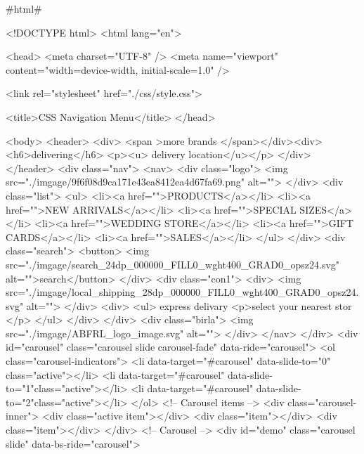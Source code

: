                                    #html#

<!DOCTYPE html>
<html lang="en">

    <head>
        <meta charset="UTF-8" />
        <meta name="viewport" content="width=device-width, initial-scale=1.0" />
 
        <link rel="stylesheet" href="./css/style.css">

    
        <title>CSS Navigation Menu</title>
    </head>

    <body>
        <header>
          <div>
<span >more brands </span></div><div>
<h6>delivering</h6> <p><u> delivery location</u></p>
</div>
        </header>
      <div class="nav">
            <nav>
                <div class="logo">
                <img src="./imgage/9f6f08d9ca171e43ea8412ea4d67fa69.png" alt="">
            </div>
                <div class="list">
                    <ul>
                    <li><a href="">PRODUCTS</a></li>
                    <li><a href="">NEW ARRIVALS</a></li>
                    <li><a href="">SPECIAL SIZES</a></li>
                    <li><a href="">WEDDING STORE</a></li>
                    <li><a href="">GIFT CARDS</a></li>
                    <li><a href="">SALES</a></li>
                </ul>
                </div>
                <div class="search">
                <button> <img src="./imgage/search_24dp_000000_FILL0_wght400_GRAD0_opsz24.svg" alt="">search</button>
                </div>
                <div class="con1">
                    <div>
                    <img src="./imgage/local_shipping_28dp_000000_FILL0_wght400_GRAD0_opsz24.svg" alt="">
                    </div>
                    <div>
                        <ul>
                              express delivary
                            <p>select your nearest stor </p>
                        </ul>
                    </div>
                </div>
                <div class="birla">
                <img src="./imgage/ABFRL_logo_image.svg" alt="">
                </div>
            </nav>
      </div>
      <div id="carousel" class="carousel slide carousel-fade" data-ride="carousel">
        <ol class="carousel-indicators">
            <li data-target="#carousel" data-slide-to="0" class="active"></li>
            <li data-target="#carousel" data-slide-to="1"class="active"></li>
            <li data-target="#carousel" data-slide-to="2"class="active"></li>
        </ol>
        <!-- Carousel items -->
        <div class="carousel-inner">
            <div class="active item"></div>
            <div class="item"></div>
            <div class="item"></div>
        </div>
        <!-- Carousel -->
<div id="demo" class="carousel slide" data-bs-ride="carousel">

